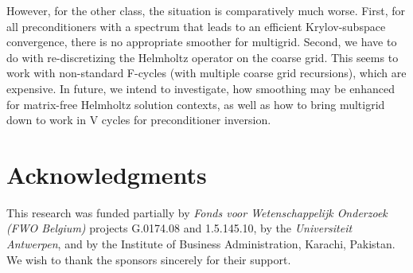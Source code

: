 \documentclass[mathpazo]{cicp}
\theoremstyle{definition}
\numberwithin{equation}{section}
\begin{document}
However, for the other class, the situation is comparatively much worse. First, for all preconditioners with a spectrum that leads to an efficient Krylov-subspace convergence, there is no appropriate smoother for multigrid.  Second, we have to do with re-discretizing the Helmholtz operator on the coarse grid. This seems to work with non-standard F-cycles (with multiple coarse grid recursions), which are expensive. In future, we intend to investigate, how smoothing may be enhanced for matrix-free Helmholtz solution contexts, as well as how to bring multigrid down to work in V cycles for preconditioner inversion. 
\section*{Acknowledgments}
This research was funded partially by \textit{Fonds voor Wetenschappelijk Onderzoek (FWO Belgium)} projects G.0174.08 and 1.5.145.10, by the \textit{Universiteit Antwerpen}, and by the Institute of Business Administration, Karachi, Pakistan. We wish to thank the sponsors sincerely for their support.



\end{document}
